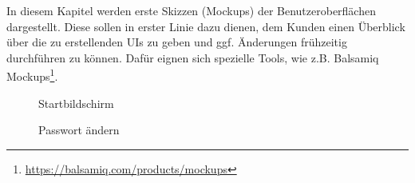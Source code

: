 \begin{tcolorbox}
In diesem Kapitel werden erste Skizzen (Mockups) der Benutzeroberflächen dargestellt.
Diese sollen in erster Linie dazu dienen, dem Kunden einen Überblick über die zu erstellenden UIs zu geben und ggf. Änderungen frühzeitig durchführen zu können.
Dafür eignen sich spezielle Tools, wie z.B. Balsamiq Mockups\footnote{\url{https://balsamiq.com/products/mockups}}.
\end{tcolorbox}

\begin{figure}[h]
	\centering
	\caption{Startbildschirm}
	\label{fig:mock-start}
\end{figure}

\begin{figure}[h]
	\centering
	\caption{Passwort ändern}
	\label{fig:mock-pw}
\end{figure}